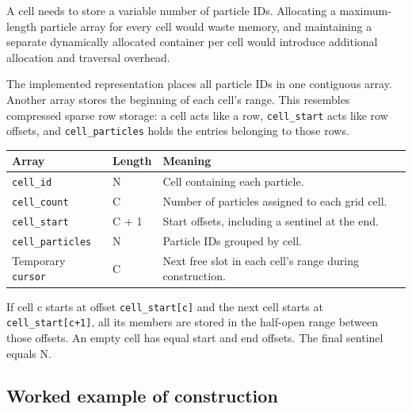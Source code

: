 \documentclass[
  11pt,
]{article}
\newcounter{none} %
\begin{document}
A cell needs to store a variable number of particle IDs. Allocating a
maximum-length particle array for every cell would waste memory, and
maintaining a separate dynamically allocated container per cell would
introduce additional allocation and traversal overhead.

The implemented representation places all particle IDs in one contiguous
array. Another array stores the beginning of each cell's range. This
resembles compressed sparse row storage: a cell acts like a row,
\texttt{cell\_start} acts like row offsets, and \texttt{cell\_particles}
holds the entries belonging to those rows.

{\def\LTcaptype{none} %
\begin{longtable}[]{@{}
  >{\raggedright\arraybackslash}p{}
  >{\raggedleft\arraybackslash}p{}
  >{\raggedright\arraybackslash}p{}@{}}
\toprule\noalign{}
\begin{minipage}[b]{\linewidth}\raggedright
Array
\end{minipage} & \begin{minipage}[b]{\linewidth}\raggedleft
Length
\end{minipage} & \begin{minipage}[b]{\linewidth}\raggedright
Meaning
\end{minipage} \\
\midrule\noalign{}
\endhead
\bottomrule\noalign{}
\endlastfoot
\texttt{cell\_id} & N & Cell containing each particle. \\
\texttt{cell\_count} & C & Number of particles assigned to each grid
cell. \\
\texttt{cell\_start} & C + 1 & Start offsets, including a sentinel at
the end. \\
\texttt{cell\_particles} & N & Particle IDs grouped by cell. \\
Temporary \texttt{cursor} & C & Next free slot in each cell's range
during construction. \\
\end{longtable}
}

If cell c starts at offset \texttt{cell\_start{[}c{]}} and the next cell
starts at \texttt{cell\_start{[}c+1{]}}, all its members are stored in
the half-open range between those offsets. An empty cell has equal start
and end offsets. The final sentinel equals N.

\subsection{Worked example of
construction}\label{worked-example-of-construction}
\end{document}
